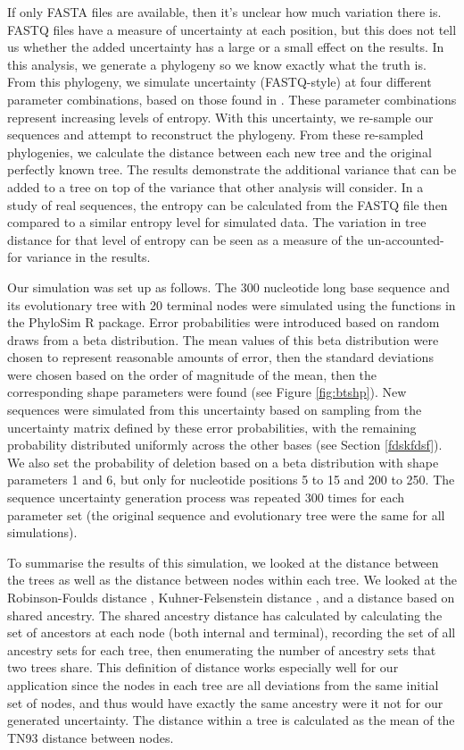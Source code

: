 \documentclass[
]{article}
\begin{document}
If only FASTA files are available, then it's unclear how much variation
there is. FASTQ files have a measure of uncertainty at each position,
but this does not tell us whether the added uncertainty has a large or a
small effect on the results. In this analysis, we generate a phylogeny
so we know exactly what the truth is. From this phylogeny, we simulate
uncertainty (FASTQ-style) at four different parameter combinations,
based on those found in \citet{Zanini}. These parameter combinations
represent increasing levels of entropy. With this uncertainty, we
re-sample our sequences and attempt to reconstruct the phylogeny. From
these re-sampled phylogenies, we calculate the distance between each new
tree and the original perfectly known tree. The results demonstrate the
additional variance that can be added to a tree on top of the variance
that other analysis will consider. In a study of real sequences, the
entropy can be calculated from the FASTQ file then compared to a similar
entropy level for simulated data. The variation in tree distance for
that level of entropy can be seen as a measure of the un-accounted-for
variance in the results.

Our simulation was set up as follows. The 300 nucleotide long base
sequence and its evolutionary tree with 20 terminal nodes were simulated
using the functions in the PhyloSim R package. Error probabilities were
introduced based on random draws from a beta distribution. The mean
values of this beta distribution were chosen to represent reasonable
amounts of error, then the standard deviations were chosen based on the
order of magnitude of the mean, then the corresponding shape parameters
were found (see Figure \ref{fig:btshp}). New sequences were simulated
from this uncertainty based on sampling from the uncertainty matrix
defined by these error probabilities, with the remaining probability
distributed uniformly across the other bases (see Section
\ref{fdskfdsf}). We also set the probability of deletion based on a beta
distribution with shape parameters 1 and 6, but only for nucleotide
positions 5 to 15 and 200 to 250. The sequence uncertainty generation
process was repeated 300 times for each parameter set (the original
sequence and evolutionary tree were the same for all simulations).

To summarise the results of this simulation, we looked at the distance
between the trees as well as the distance between nodes within each
tree. We looked at the Robinson-Foulds distance \citep{xxx},
Kuhner-Felsenstein distance \citep{xxx}, and a distance based on shared
ancestry. The shared ancestry distance has calculated by calculating the
set of ancestors at each node (both internal and terminal), recording
the set of all ancestry sets for each tree, then enumerating the number
of ancestry sets that two trees share. This definition of distance works
especially well for our application since the nodes in each tree are all
deviations from the same initial set of nodes, and thus would have
exactly the same ancestry were it not for our generated uncertainty. The
distance within a tree is calculated as the mean of the TN93 distance
between nodes.
\end{document}
